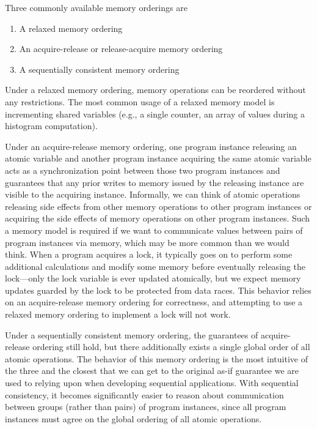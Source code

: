 Three commonly available memory orderings are\par

\begin{enumerate}
	\item A relaxed memory ordering
	\item An acquire-release or release-acquire memory ordering
	\item A sequentially consistent memory ordering
\end{enumerate}

Under a relaxed memory ordering, memory operations can be reordered without any restrictions. The most common usage of a relaxed memory model is incrementing shared variables (e.g., a single counter, an array of values during a histogram computation).\par

Under an acquire-release memory ordering, one program instance releasing an atomic variable and another program instance acquiring the same atomic variable acts as a synchronization point between those two program instances and guarantees that any prior writes to memory issued by the releasing instance are visible to the acquiring instance. Informally, we can think of atomic operations releasing side effects from other memory operations to other program instances or acquiring the side effects of memory operations on other program instances. Such a memory model is required if we want to communicate values between pairs of program instances via memory, which may be more common than we would think. When a program acquires a lock, it typically goes on to perform some additional calculations and modify some memory before eventually releasing the lock—only the lock variable is ever updated atomically, but we expect memory updates guarded by the lock to be protected from data races. This behavior relies on an acquire-release memory ordering for correctness, and attempting to use a relaxed memory ordering to implement a lock will not work.\par

Under a sequentially consistent memory ordering, the guarantees of acquire-release ordering still hold, but there additionally exists a single global order of all atomic operations. The behavior of this memory ordering is the most intuitive of the three and the closest that we can get to the original as-if guarantee we are used to relying upon when developing sequential applications. With sequential consistency, it becomes significantly easier to reason about communication between groups (rather than pairs) of program instances, since all program instances must agree on the global ordering of all atomic operations.\par

